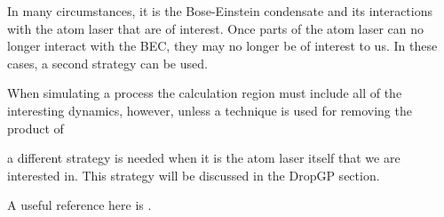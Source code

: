 In many circumstances, it is the Bose-Einstein condensate and its interactions with the atom laser that are of interest. Once parts of the atom laser can no longer interact with the BEC, they may no longer be of interest to us. In these cases, a second strategy can be used.


When simulating a process the calculation region must include all of the interesting dynamics, however, unless a technique is used for removing the product of 

a different strategy is needed when it is the atom laser itself that we are interested in. This strategy will be discussed in the DropGP section.


A useful reference here is \citep{Neuhasuer:1989}.

